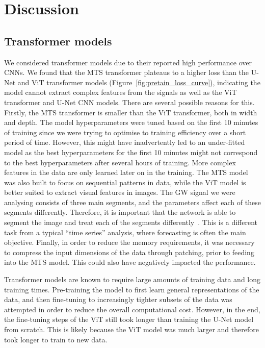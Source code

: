 \section{Discussion}
\label{sec:discussion}

\subsection{Transformer models}

We considered transformer models due to their reported high performance over CNNs. We found that the MTS transformer plateaus to a higher loss than the U-Net and ViT transformer models (Figure~\ref{fig:pretain_loss_curve}), indicating the model cannot extract complex features from the signals as well as the ViT transformer and U-Net CNN models. There are several possible reasons for this. Firstly, the MTS transformer is smaller than the ViT transformer, both in width and depth. The model hyperparameters were tuned based on the first 10 minutes of training since we were trying to optimise to training efficiency over a short period of time. However, this might have inadvertently led to an under-fitted model as the best hyperparameters for the first 10 minutes might not correspond to the best hyperparameters after several hours of training. More complex features in the data are only learned later on in the training. The MTS model was also built to focus on sequential patterns in data, while the ViT model is better suited to extract visual features in images. The GW signal we were analysing consists of three main segments, and the parameters affect each of these segments differently. Therefore, it is important that the network is able to segment the image and treat each of the segments differently~\cite{bhardwaj2023peregrine}. This is a different task from a typical \enquote{time series} analysis, where forecasting is often the main objective. Finally, in order to reduce the memory requirements, it was necessary to compress the input dimensions of the data through patching, prior to feeding into the MTS model. This could also have negatively impacted the performance.

Transformer models are known to require large amounts of training data and long training times. Pre-training the model to first learn general representations of the data, and then fine-tuning to increasingly tighter subsets of the data was attempted in order to reduce the overall computational cost. However, in the end, the fine-tuning steps of the ViT still took longer than training the U-Net model from scratch.  This is likely because the ViT model was much larger and therefore took longer to train to new data.

